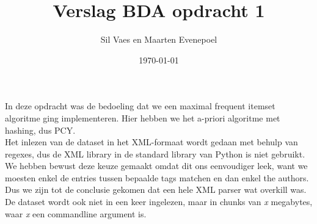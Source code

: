 \documentclass[11pt]{article}
\author{Sil Vaes en Maarten Evenepoel}
\date{\today}
\title{Verslag BDA opdracht 1}
\begin{document}
\maketitle
\setlength\parindent{0pt}

In deze opdracht was de bedoeling dat we een maximal frequent itemset algoritme ging implementeren. Hier hebben we het a-priori algoritme met hashing, dus PCY.\\


Het inlezen van de dataset in het XML-formaat wordt gedaan met behulp van regexes, dus de XML library in de standard library van Python is niet gebruikt. We hebben bewust deze keuze gemaakt omdat dit ons eenvoudiger leek, want we moesten enkel de entries tussen bepaalde tags matchen en dan enkel the authors. Dus we zijn tot de conclusie gekomen dat een hele XML parser wat overkill was.\\


De dataset wordt ook niet in een keer ingelezen, maar in chunks van \emph{x} megabytes, waar \emph{x} een commandline argument is.
\end{document}
